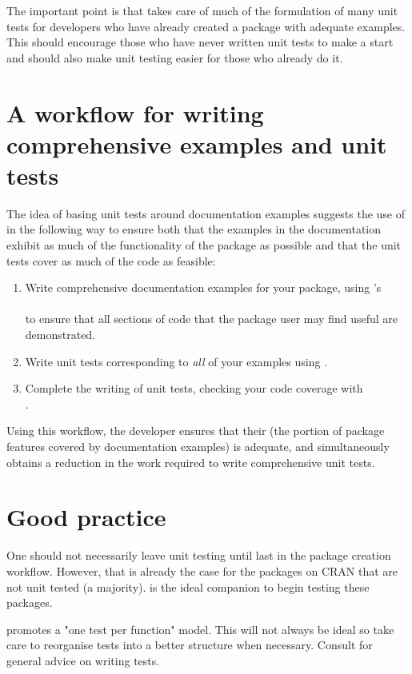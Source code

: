 The important point is that  takes care of much of the formulation of many unit tests for developers who have already created a package with adequate examples. This should encourage those who have never written unit tests to make a start and should also make unit testing easier for those who already do it.

\section{A workflow for writing comprehensive examples and unit tests}
The idea of basing unit tests around documentation examples suggests the use of  \citep{covr} in the following way to ensure both that the examples in the documentation exhibit as much of the functionality of the package as possible and that the unit tests cover as much of the code as feasible:
\begin{enumerate}
	\item Write comprehensive documentation examples for your package, using 's\\ 
	 \\
	to ensure that all sections of code that the package user may find useful are demonstrated.
	\item Write unit tests corresponding to \emph{all} of your examples using .
	\item Complete the writing of unit tests, checking your code coverage with \\ .
\end{enumerate}
Using this workflow, the developer ensures that their  (the portion of package features covered by documentation examples) is adequate, and simultaneously obtains a reduction in the work required to write comprehensive unit tests. 

\section{Good practice}
One should not necessarily leave unit testing until last in the package creation workflow. However, that is already the case for the packages on CRAN that are not unit tested (a majority).  is the ideal companion to begin testing these packages. 

 promotes a "one test per function" model. This will not always be ideal so take care to reorganise tests into a better structure when necessary. Consult \citet{r-pkgs} for general advice on writing tests. 

